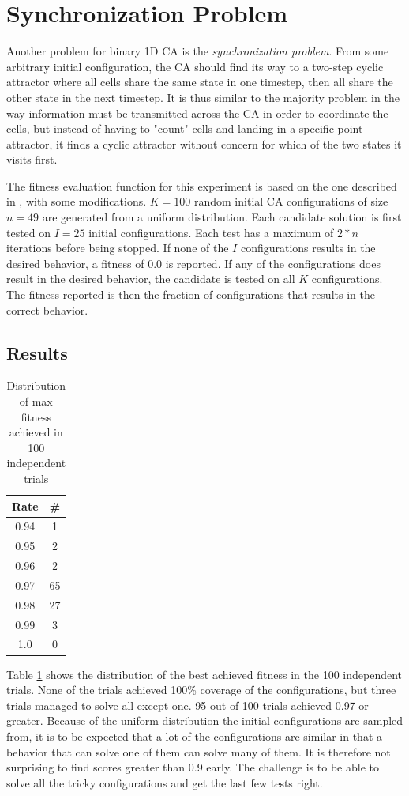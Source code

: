\section{Synchronization Problem}
Another problem for binary 1D CA is the \textit{synchronization problem}.
From some arbitrary initial configuration,
the CA should find its way to a two-step cyclic attractor where all cells share the same state in one timestep,
then all share the other state in the next timestep.
It is thus similar to the majority problem in the way information must be transmitted across the CA in order to coordinate the cells,
but instead of having to "count" cells and landing in a specific point attractor, it finds a cyclic attractor without concern for which of the two states it visits first.

The fitness evaluation function for this experiment is based on the one described in \cite{das1995evolving}, with some modifications.
$K=100$ random initial CA configurations of size $n=49$ are generated from a uniform distribution.
Each candidate solution is first tested on $I=25$ initial configurations.
Each test has a maximum of $2*n$ iterations before being stopped.
If none of the $I$ configurations results in the desired behavior, a fitness of $0.0$ is reported.
If any of the configurations does result in the desired behavior, the candidate is tested on all $K$ configurations.
The fitness reported is then the fraction of configurations that results in the correct behavior.

\subsection{Results}
\begin{table}
\centering
\begin{tabular}{c|c}
Rate & \# \\\hline
0.94 & 1 \\
0.95 & 2 \\
0.96 & 2 \\
0.97 & 65 \\
0.98 & 27 \\
0.99 & 3 \\
1.0 & 0 \\
\end{tabular}
\caption{Distribution of max fitness achieved in 100 independent trials}
\label{tbl:synchronization_training}
\end{table}

Table \ref{tbl:synchronization_training} shows the distribution of the best achieved fitness in the 100 independent trials.
None of the trials achieved 100\% coverage of the configurations, but three trials managed to solve all except one.
95 out of 100 trials achieved 0.97 or greater.
Because of the uniform distribution the initial configurations are sampled from,
it is to be expected that a lot of the configurations are similar in that a behavior that can solve one of them can solve many of them.
It is therefore not surprising to find scores greater than $0.9$ early.
The challenge is to be able to solve all the tricky configurations and get the last few tests right.

